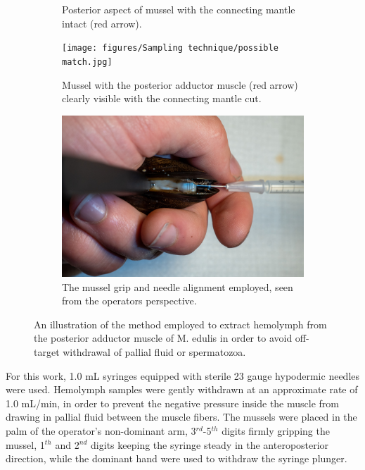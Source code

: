 \begin{figure}[H]
\begin{subfigure}[b]{.45\textwidth}
        \caption{Posterior aspect of mussel with the connecting mantle intact (red arrow).}
        \label{sfig:b}
    \end{subfigure}
    \newline
    \begin{subfigure}[b]{.45\textwidth}
        \centering
        \texttt{[image: figures/Sampling technique/possible match.jpg]}
        \caption{Mussel with the posterior adductor muscle (red arrow) clearly visible with the connecting mantle cut.}
        \label{sfig:c}
    \end{subfigure}
    \hfill
    \begin{subfigure}[b]{.45\textwidth}
        \centering
        \includegraphics[width=\textwidth]{figures/Sampling technique/hands colors centered.jpg}
        \caption{The mussel grip and needle alignment employed, seen from the operators perspective.}
        \label{sfig:d}
    \end{subfigure}
    \caption{An illustration of the method employed to extract hemolymph from the posterior adductor muscle of M. edulis in order to avoid off-target withdrawal of pallial fluid or spermatozoa.}
    \label{fig:Hemolymph_sampling_illustration}
\end{figure}

For this work, 1.0 mL syringes equipped with sterile 23 gauge hypodermic needles were used. Hemolymph samples were gently withdrawn at an approximate rate of 1.0 mL/min, in order to prevent the negative pressure inside the muscle from drawing in pallial fluid between the muscle fibers. The mussels were placed in the palm of the operator's non-dominant arm, 3$^{rd}$-5$^{th}$ digits firmly gripping the mussel, 1$^{th}$ and 2$^{nd}$ digits keeping the syringe steady in the anteroposterior direction, while the dominant hand were used to withdraw the syringe plunger.

